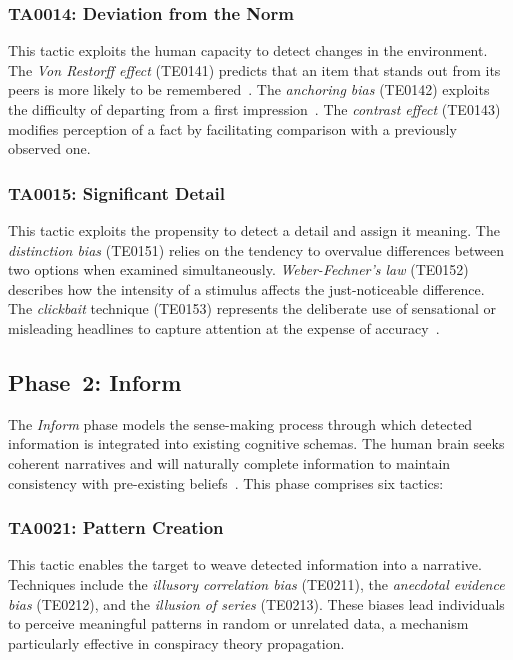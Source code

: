 \documentclass[11pt,a4paper]{article}
\begin{document}
\subsubsection{TA0014: Deviation from the Norm}
This tactic exploits the human capacity to detect changes in the environment. The \textit{Von Restorff effect} (TE0141) predicts that an item that stands out from its peers is more likely to be remembered~\cite{vonrestorff1933}. The \textit{anchoring bias} (TE0142) exploits the difficulty of departing from a first impression~\cite{tversky1974}. The \textit{contrast effect} (TE0143) modifies perception of a fact by facilitating comparison with a previously observed one.

\subsubsection{TA0015: Significant Detail}
This tactic exploits the propensity to detect a detail and assign it meaning. The \textit{distinction bias} (TE0151) relies on the tendency to overvalue differences between two options when examined simultaneously. \textit{Weber-Fechner's law} (TE0152) describes how the intensity of a stimulus affects the just-noticeable difference. The \textit{clickbait} technique (TE0153) represents the deliberate use of sensational or misleading headlines to capture attention at the expense of accuracy~\cite{potthast2016}.

\subsection{Phase~2: Inform}

The \textit{Inform} phase models the sense-making process through which detected information is integrated into existing cognitive schemas. The human brain seeks coherent narratives and will naturally complete information to maintain consistency with pre-existing beliefs~\cite{kahneman2011}. This phase comprises six tactics:

\subsubsection{TA0021: Pattern Creation}
This tactic enables the target to weave detected information into a narrative. Techniques include the \textit{illusory correlation bias} (TE0211), the \textit{anecdotal evidence bias} (TE0212), and the \textit{illusion of series} (TE0213). These biases lead individuals to perceive meaningful patterns in random or unrelated data, a mechanism particularly effective in conspiracy theory propagation.
\end{document}

